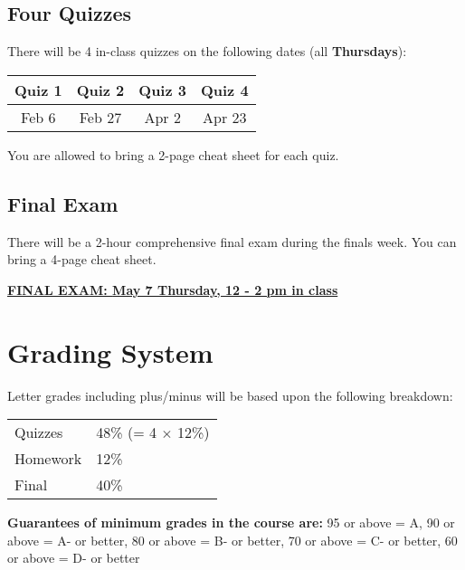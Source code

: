 \documentclass{article}
\begin{document}
	\subsection{Four Quizzes}
	There will be 4 in-class quizzes on the following dates (all {\bf
	Thursdays}):
	\begin{center}
	\begin{tabular}{cccc}
		\toprule
	Quiz 1 & Quiz 2 & Quiz 3 & Quiz 4\\
	\midrule
	Feb 6 & Feb 27 & Apr 2 & Apr 23\\
	\bottomrule
	\end{tabular}
	\end{center}
	You are allowed to bring a 2-page cheat sheet for each quiz.
	\subsection{Final Exam}
	There will be a 2-hour comprehensive final exam during the finals week.
	You can bring a 4-page cheat sheet.

	\begin{center}
		\underline{\bf FINAL EXAM:  {\color{red} May 7 Thursday, 12 - 2 pm} in class}
	\end{center}

	\section{Grading System}
	Letter grades including plus/minus will be based upon the following
	breakdown:
	\begin{center}
		\begin{tabular}{l|l}
			\toprule
			Quizzes & 48\% (= 4 $\times$ 12\%)\\ 
			Homework & 12\%\\ 
			Final & 40\%\\ \bottomrule
		\end{tabular}
	\end{center}

\textbf{Guarantees of minimum grades in the course are:} 95 or above = A, 90 or above = A- or
better, 80 or above = B- or better, 70 or above = C- or better, 60 or above = D- or better	
\end{document}
